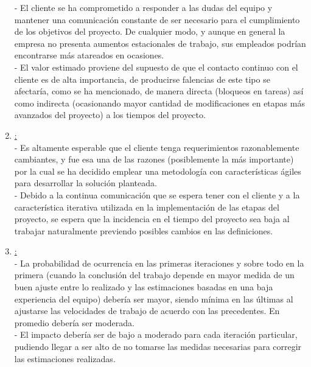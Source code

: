 \documentclass[a4paper, 12pt,twoside]{report}  %
\numberwithin{equation}{subsection} %
\begin{document}
\begin{enumerate}
	- El cliente se ha comprometido a responder a las dudas del equipo y mantener una comunicación constante de ser necesario para el cumplimiento de los objetivos del proyecto. De cualquier modo, y aunque en general la empresa no presenta aumentos estacionales de trabajo, sus empleados podrían encontrarse más atareados en ocasiones.\\
	- El valor estimado proviene del supuesto de que el contacto continuo con el cliente es de alta importancia, de producirse falencias de este tipo se afectaría, como se ha mencionado, de manera directa (bloqueos en tareas) así como indirecta (ocasionando mayor cantidad de modificaciones en etapas más avanzados del proyecto) a los tiempos del proyecto.
	\item \underline{:}\\
	- Es altamente esperable que el cliente tenga requerimientos razonablemente cambiantes, y fue esa una de las razones (posiblemente la más importante) por la cual se ha decidido emplear una metodología con características ágiles para desarrollar la solución planteada.\\
	- Debido a la continua comunicación que se espera tener con el cliente y a la característica iterativa utilizada en la implementación de las etapas del proyecto, se espera que la incidencia en el tiempo del proyecto sea baja al trabajar naturalmente previendo posibles cambios en las definiciones.
	\item \underline{:}\\
	- La probabilidad de ocurrencia en las primeras iteraciones y sobre todo en la primera (cuando la conclusión del trabajo depende en mayor medida de un buen ajuste entre lo realizado y las estimaciones basadas en una baja experiencia del equipo) debería ser mayor, siendo mínima en las últimas al ajustarse las velocidades de trabajo de acuerdo con las precedentes. En promedio debería ser moderada.\\
	- El impacto debería ser de bajo a moderado para cada iteración particular, pudiendo llegar a ser alto de no tomarse las medidas necesarias para corregir las estimaciones realizadas.
\end{enumerate}
\end{document}
